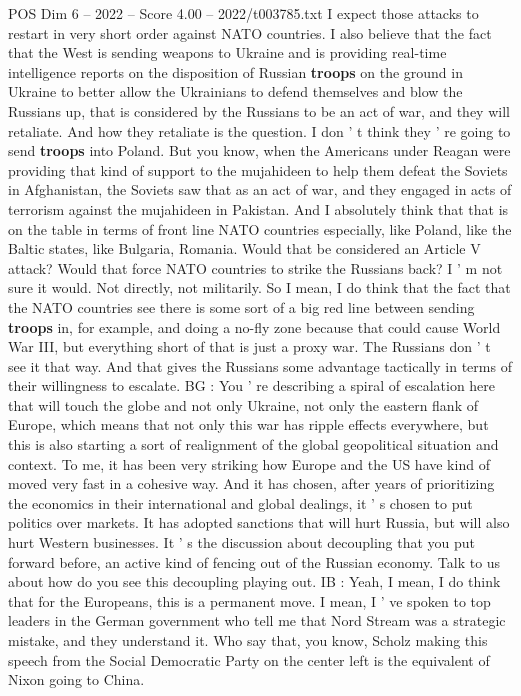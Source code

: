 \begin{textsample}{POS Dim 6 – 2022 – Score 4.00 – 2022/t003785.txt}
I expect those attacks to restart in very short order against NATO countries.
I also believe that the fact that the West is sending weapons to Ukraine and is providing real-time intelligence reports on the disposition of Russian \textbf{troops} on the ground in Ukraine to better allow the Ukrainians to defend themselves and blow the Russians up, that is considered by the Russians to be an act of war, and they will retaliate.
And how they retaliate is the question.
I don ' t think they ' re going to send \textbf{troops} into Poland.
But you know, when the Americans under Reagan were providing that kind of support to the mujahideen to help them defeat the Soviets in Afghanistan, the Soviets saw that as an act of war, and they engaged in acts of terrorism against the mujahideen in Pakistan.
And I absolutely think that that is on the table in terms of front line NATO countries especially, like Poland, like the Baltic states, like Bulgaria, Romania.
Would that be considered an Article V attack?
Would that force NATO countries to strike the Russians back?
I ' m not sure it would.
Not directly, not militarily.
So I mean, I do think that the fact that the NATO countries see there is some sort of a big red line between sending \textbf{troops} in, for example, and doing a no-fly zone because that could cause World War III, but everything short of that is just a proxy war.
The Russians don ' t see it that way.
And that gives the Russians some advantage tactically in terms of their willingness to escalate.
BG : You ' re describing a spiral of escalation here that will touch the globe and not only Ukraine, not only the eastern flank of Europe, which means that not only this war has ripple effects everywhere, but this is also starting a sort of realignment of the global geopolitical situation and context.
To me, it has been very striking how Europe and the US have kind of moved very fast in a cohesive way.
And it has chosen, after years of prioritizing the economics in their international and global dealings, it ' s chosen to put politics over markets.
It has adopted sanctions that will hurt Russia, but will also hurt Western businesses.
It ' s the discussion about decoupling that you put forward before, an active kind of fencing out of the Russian economy.
Talk to us about how do you see this decoupling playing out.
IB : Yeah, I mean, I do think that for the Europeans, this is a permanent move.
I mean, I ' ve spoken to top leaders in the German government who tell me that Nord Stream was a strategic mistake, and they understand it.
Who say that, you know, Scholz making this speech from the Social Democratic Party on the center left is the equivalent of Nixon going to China.

\end{textsample}
